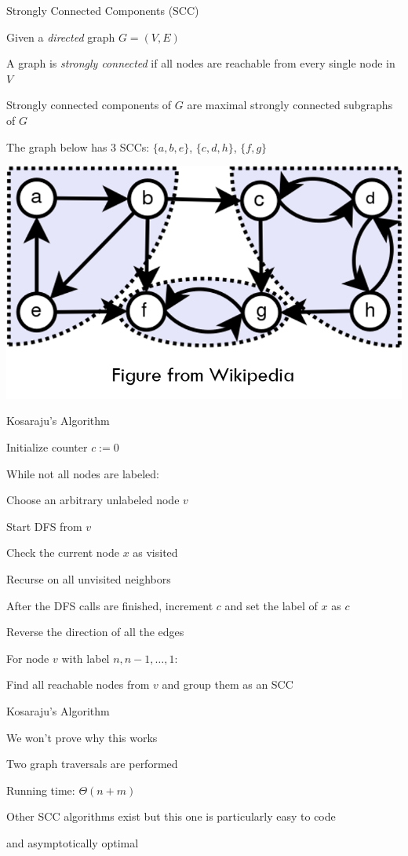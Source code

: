 \documentclass[13pt,onlymath]{beamer}
\begin{document}
\begin{frame}{Strongly Connected Components (SCC)}
\BIT
\item Given a \emph{directed} graph $G = (V, E)$
\item A graph is \emph{strongly connected} if all nodes are reachable from every single node in $V$
\item Strongly connected components of $G$ are maximal strongly connected subgraphs of $G$
\item The graph below has 3 SCCs: $\{a, b, e\}$, $\{c, d, h\}$, $\{f, g\}$
\EIT
\begin{center}
\includegraphics[height=0.3\textheight]{figures/scc_example}
\end{center}
\end{frame}

\begin{frame}{Kosaraju's Algorithm}
\BIT
\item Initialize counter $c := 0$
\item While not all nodes are labeled:
\BIT
\item Choose an arbitrary unlabeled node $v$
\item Start DFS from $v$
\BIT
\item Check the current node $x$ as visited
\item Recurse on all unvisited neighbors
\item After the DFS calls are finished, increment $c$ and set the label of $x$ as $c$
\EIT
\EIT
\item Reverse the direction of all the edges
\item For node $v$ with label $n, n-1, \ldots, 1$:
\BIT
\item Find all reachable nodes from $v$ and group them as an SCC
\EIT
\EIT
\end{frame}

\begin{frame}{Kosaraju's Algorithm}
\BIT
\item We won't prove why this works
\item Two graph traversals are performed
\BIT
\item Running time: $\Theta(n+m)$
\EIT
\vfill
\item Other SCC algorithms exist but this one is particularly easy to code
\BIT
\item and asymptotically optimal
\EIT
\EIT
\end{frame}
\end{document}
